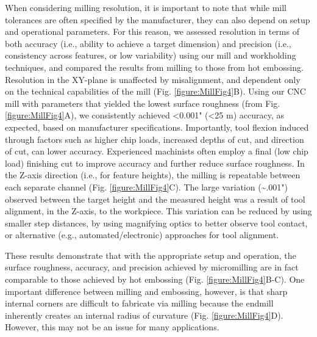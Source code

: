 When considering milling resolution, it is important to note that while mill tolerances are often specified by the manufacturer, they can also depend on setup and operational parameters. For this reason, we assessed resolution in terms of both accuracy (i.e., ability to achieve a target dimension) and precision (i.e., consistency across features, or low variability) using our mill and workholding techniques, and compared the results from milling to those from hot embossing. Resolution in the XY-plane is unaffected by misalignment, and dependent only on the technical capabilities of the mill (Fig. \ref{figure:MillFig4}B). Using our CNC mill with parameters that yielded the lowest surface roughness (from Fig. \ref{figure:MillFig4}A), we consistently achieved <0.001" (<25 \textmu m) accuracy, as expected, based on manufacturer specifications. Importantly, tool flexion induced through factors such as higher chip loads, increased depths of cut, and direction of cut, can lower accuracy. Experienced machinists often employ a final (low chip load) finishing cut to improve accuracy and further reduce surface roughness. In the Z-axis direction (i.e., for feature heights), the milling is repeatable between each separate channel (Fig. \ref{figure:MillFig4}C). The large variation (\textasciitilde.001") observed between the target height and the measured height was a result of tool alignment, in the Z-axis, to the workpiece.  This variation can be reduced by using smaller step distances, by using magnifying optics to better observe tool contact, or alternative (e.g., automated/electronic) approaches for tool alignment. 

These results demonstrate that with the appropriate setup and operation, the surface roughness, accuracy, and precision achieved by micromilling are in fact comparable to those achieved by hot embossing (Fig. \ref{figure:MillFig4}B-C). One important difference between milling and embossing, however, is that sharp internal corners are difficult to fabricate via milling because the endmill inherently creates an internal radius of curvature (Fig. \ref{figure:MillFig4}D). However, this may not be an issue for many applications.

